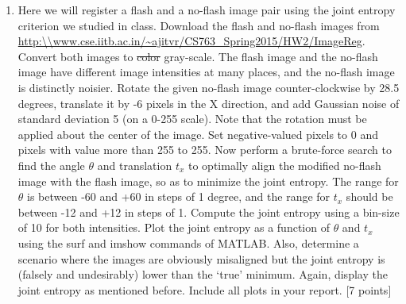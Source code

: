 \documentclass[11pt]{article}
\begin{document}
\begin{enumerate}
\item Here we will register a flash and a no-flash image pair using the joint entropy criterion we studied in class. Download the flash and no-flash images from \url{http:\\www.cse.iitb.ac.in/~ajitvr/CS763_Spring2015/HW2/ImageReg}. Convert both images to \sout{color} gray-scale. The flash image and the no-flash image have different image intensities at many places, and the no-flash image is distinctly noisier. Rotate the given no-flash image counter-clockwise by 28.5 degrees, translate it by -6 pixels in the X direction, and add Gaussian noise of standard deviation 5 (on a 0-255 scale). Note that the rotation must be applied about the center of the image. Set negative-valued pixels to 0 and pixels with value more than 255 to 255. Now perform a brute-force search to find the angle $\theta$ and translation $t_x$ to optimally align the modified no-flash image with the flash image, so as to minimize the joint entropy. The range for $\theta$ is between -60 and +60 in steps of 1 degree, and the range for $t_x$ should be between -12 and +12 in steps of 1. Compute the joint entropy using a bin-size of 10 for both intensities. Plot the joint entropy as a function of $\theta$ and $t_x$ using the surf and imshow commands of MATLAB. Also, determine a scenario where the images are obviously misaligned but the joint entropy is (falsely and undesirably) lower than the `true' minimum. Again, display the joint entropy as mentioned before. Include all plots in your report. \textsf{[7 points]} 

\end{enumerate}
\end{document}
